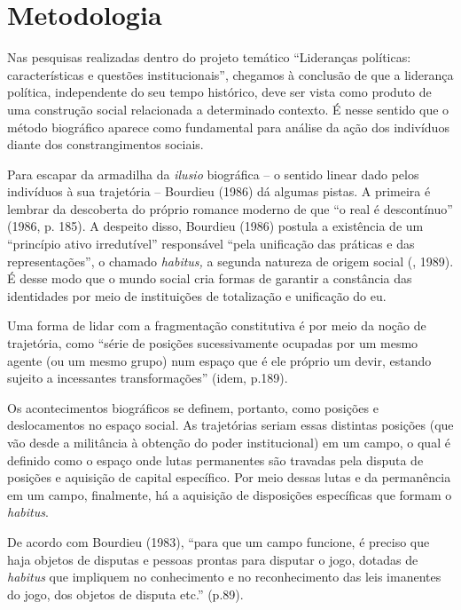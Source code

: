 \section{Metodologia}

Nas pesquisas realizadas dentro do projeto temático ``Lideranças
políticas: características e questões institucionais'', chegamos à
conclusão de que a liderança política, independente do seu tempo
histórico, deve ser vista como produto de uma construção social
relacionada a determinado contexto. É nesse sentido que o método
biográfico aparece como fundamental para análise da ação dos indivíduos
diante dos constrangimentos sociais.

Para escapar da armadilha da \emph{ilusio} biográfica -- o sentido
linear dado pelos indivíduos à sua trajetória -- Bourdieu (1986) dá
algumas pistas. A primeira é lembrar da descoberta do próprio romance
moderno de que ``o real é descontínuo'' (1986, p. 185). A despeito
disso, Bourdieu (1986) postula a existência de um ``princípio ativo
irredutível'' responsável ``pela unificação das práticas e das
representações'', o chamado \emph{habitus,} a segunda natureza de origem
social (, 1989). É desse modo que o mundo social cria formas de
garantir a constância das identidades por meio de instituições de
totalização e unificação do eu.

Uma forma de lidar com a fragmentação constitutiva é por meio da noção
de trajetória, como ``série de posições sucessivamente ocupadas por um
mesmo agente (ou um mesmo grupo) num espaço que é ele próprio um devir,
estando sujeito a incessantes transformações'' (idem, p.189).

Os acontecimentos biográficos se definem, portanto, como posições e
deslocamentos no espaço social. As trajetórias seriam essas distintas
posições (que vão desde a militância à obtenção do poder institucional)
em um campo, o qual é definido como o espaço onde lutas permanentes são
travadas pela disputa de posições e aquisição de capital específico. Por
meio dessas lutas e da permanência em um campo, finalmente, há a
aquisição de disposições específicas que formam o \emph{habitus}.

De acordo com Bourdieu (1983), ``para que um campo funcione, é preciso
que haja objetos de disputas e pessoas prontas para disputar o jogo,
dotadas de \emph{habitus} que impliquem no conhecimento e no
reconhecimento das leis imanentes do jogo, dos objetos de disputa etc.''
(p.89).

